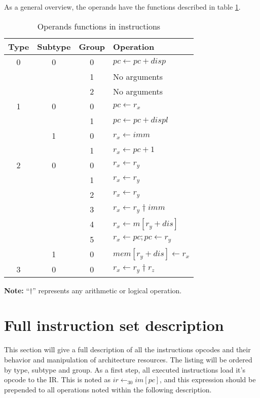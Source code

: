 As a general overview, the operands have the functions described in table \ref{tbl:operands_functions}.

\begin{table}[h]
\begin{center}
\begin{tabular}{|c|c|c|l|}
\hline
\textbf{Type} & \textbf{Subtype} & \textbf{Group} & \textbf{Operation} \\
\hline
\hline
0 & 0 & 0 & $pc \longleftarrow pc + disp$                  \\
  &   & 1 & No arguments                                  \\
  &   & 2 & No arguments                                   \\
\hline
\hline
1 & 0 & 0 & $pc \longleftarrow r_x$                        \\
  &   & 1 & $pc \longleftarrow pc + displ$                 \\
\hline
  & 1 & 0 & $r_x \longleftarrow imm$                       \\
  &   & 1 & $r_x \longleftarrow pc + 1$                    \\
\hline
\hline
2 & 0 & 0 & $r_{x} \longleftarrow r_{y}$                       \\
  &   & 1 & $r_{x} \longleftarrow r_{y}$                       \\
  &   & 2 & $r_{x} \longleftarrow r_{y}$                       \\
  &   & 3 & $r_{x} \longleftarrow r_{y} \dagger imm$           \\
  &   & 4 & $r_{x} \longleftarrow m[r_{y} + dis]$              \\
  &   & 5 & $r_{x} \longleftarrow pc; pc \longleftarrow r_{y}$ \\
\hline
  & 1 & 0 & $mem[r_{y} + dis] \longleftarrow r_{x}$            \\
\hline
\hline
3 & 0 & 0 & $r_{x} \longleftarrow r_{y} \dagger r_{z}$         \\
\hline
\end{tabular}
\end{center}
\begin{center}
\footnotesize{\textbf{Note:} ``$\dagger$'' represents any arithmetic or logical operation.} 
\end{center}
\caption{Operands functions in instructions}
\label{tbl:operands_functions}
\end{table}


\section{Full instruction set description}
\label{sec:full_isa_description}
This section will give a full description of all the instructions opcodes and their behavior and manipulation of architecture resources.
The listing will be ordered by type, subtype and group. As a first step, all executed instructions load it's opcode to the IR. This is
noted as $ir \longleftarrow_{30} im[pc]$, and this expression should be prepended to all operations noted within the following
description.

